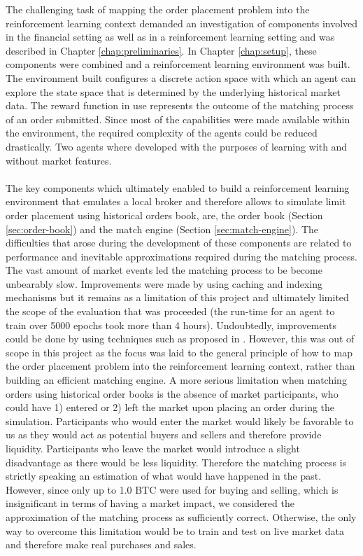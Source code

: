    The challenging task of mapping the order placement problem into the reinforcement learning context demanded an investigation of components involved in the financial setting as well as in a reinforcement learning setting and was described in Chapter \ref{chap:preliminaries}.
    In Chapter \ref{chap:setup}, these components were combined and a reinforcement learning environment was built.
    The environment built configures a discrete action space with which an agent can explore the state space that is determined by the underlying historical market data.
    The reward function in use represents the outcome of the matching process of an order submitted.
    Since most of the capabilities were made available within the environment, the required complexity of the agents could be reduced drastically.
    Two agents where developed with the purposes of learning with and without market features.
    \\
    \\
    The key components which ultimately enabled to build a reinforcement learning environment that emulates a local broker and therefore allows to simulate limit order placement using historical orders book, are, the order book (Section \ref{sec:order-book}) and the match engine (Section \ref{sec:match-engine}).
    The difficulties that arose during the development of these components are related to performance and inevitable approximations required during the matching process.
    The vast amount of market events led the matching process to be become unbearably slow.
    Improvements were made by using caching and indexing mechanisms but it remains as a limitation of this project and ultimately limited the scope of the evaluation that was proceeded (the run-time for an agent to train over 5000 epochs took more than 4 hours).
    Undoubtedly, improvements could be done by using techniques such as proposed in \cite{barazzutti2016exploiting}.
    However, this was out of scope in this project as the focus was laid to the general principle of how to map the order placement problem into the reinforcement learning context, rather than building an efficient matching engine.
    A more serious limitation when matching orders using historical order books is the absence of market participants, who could have 1) entered or 2) left the market upon placing an order during the simulation.
    Participants who would enter the market would likely be favorable to us as they would act as potential buyers and sellers and therefore provide liquidity.
    Participants who leave the market would introduce a slight disadvantage as there would be less liquidity.
    Therefore the matching process is strictly speaking an estimation of what would have happened in the past.
    However, since only up to 1.0 BTC were used for buying and selling, which is insignificant in terms of having a market impact\cite{hautsch2012market}, we considered the approximation of the matching process as sufficiently correct.
    Otherwise, the only way to overcome this limitation would be to train and test on live market data and therefore make real purchases and sales.
    

